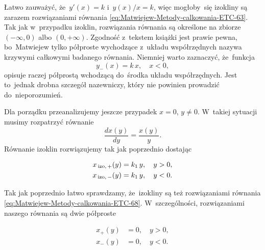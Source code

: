 \documentclass[a4paper,11pt]{article}
\numberwithin{equation}{section}
\begin{document}
Łatwo zauważyć, że~$y'( x ) = k$ i~$y( x ) / x = k$, więc mogłoby~się
izokliny są zarazem rozwiązaniami równania
\eqref{eq:Matwiejew-Metody-calkowania-ETC-63}. Tak jak w~przypadku izoklin,
rozwiązania równania są określone na zbiorze $( -\infty, 0 )$
albo $( 0, +\infty )$. Zgodność z~tekstem książki jest prawie pewna,
bo~Matwiejew tylko półproste wychodzące z~układu współrzędnych nazywa
krzywymi całkowymi badanego równania. Niemniej warto zaznaczyć, że~funkcja
\begin{equation}
  \label{eq:Uwagi-do-konkrentych-stron-48}
  y_{ - }( x ) = k \, x, \quad
  x < 0,
\end{equation}
opisuje raczej półprostą wchodzącą do~środka układu współrzędnych. Jest
to~jednak drobna szczegół nazewniczy, który nie powinien prowadzić
do~nieporozumień.

Dla porządku przeanalizujemy jeszcze przypadek $x = 0$, $y \neq 0$. W~takiej
sytuacji musimy rozpatrzyć równanie
\begin{equation}
  \label{eq:Uwagi-do-konkrentych-stron-49}
  \frac{ d x( y ) }{ d y } = \frac{ x( y ) }{ y }.
\end{equation}
Równanie izoklin rozwiązujemy tak jak poprzednio dostając

\negVerSpaceFour


\begin{subequations}

  \begin{align}
    \label{eq:Uwagi-do-konkrentych-stron-50-A}
    x_{ \, \textrm{izo}, \, + }( y )
    &= k_{ 1 } \, y, \quad
      y > 0, \\
    \label{eq:Uwagi-do-konkrentych-stron-50-B}
    x_{ \, \textrm{izo}, \, - }( y )
    &= k_{ 1 } \, y, \quad
      y < 0.
  \end{align}

\end{subequations}


\noindent
Tak jak poprzednio łatwo sprawdzamy, że~izokliny są też rozwiązaniami
równania \eqref{eq:Matwiejew-Metody-calkowania-ETC-68}. W~szczególności,
rozwiązaniami naszego równania są dwie półproste

\negVerSpaceFour


\begin{subequations}

  \begin{align}
    \label{eq:Uwagi-do-konkrentych-stron-51-A}
    x_{ + }( y )
    &= 0, \quad
      y > 0, \\
    \label{eq:Uwagi-do-konkrentych-stron-51-B}
    x_{ - }( y )
    &= 0, \quad
      y < 0.
  \end{align}

\end{subequations}
\end{document}

